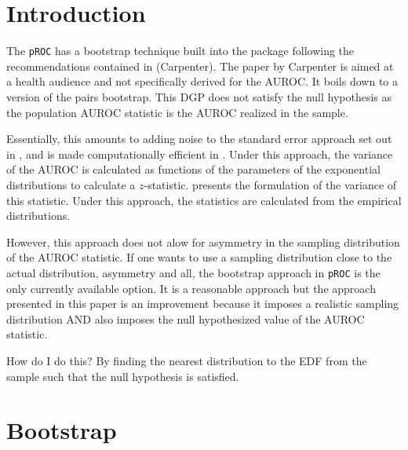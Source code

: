 

\section{Introduction}

The \texttt{pROC} has a bootstrap technique built into the package following the recommendations contained in (Carpenter). 
The paper by Carpenter is aimed at a health audience and not specifically derived for the AUROC. 
It boils down to a version of the pairs bootstrap. 
This DGP does not satisfy the null hypothesis as the population AUROC statistic is the AUROC realized in the sample.

Essentially, this amounts to adding noise to the standard error approach set out 
in \citet{delong1988}, and is made computationally efficient in \citet{sunxu2014}.
Under this approach, the variance of the AUROC is calculated as functions of the parameters of the exponential distributions 
to calculate a $z$-statistic.
\citet{hanleymcneil1982} presents the formulation of the variance of this statistic.
Under this approach, the statistics are calculated from the empirical distributions. 

However, this approach does not alow for asymmetry in the sampling distribution of the AUROC statistic. 
If one wants to use a sampling distribution close to the actual distribution, asymmetry and all, the bootstrap approach in \texttt{pROC} is the only currently available option. 
It is a reasonable approach but the approach presented in this paper is an improvement because it imposes a realistic sampling distribution AND also imposes the null hypothesized value of the AUROC statistic. 

How do I do this? By finding the nearest distribution to the EDF from the sample such that the null hypothesis is satisfied. 



\section{Bootstrap}


